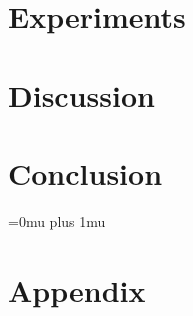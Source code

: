 \chapter{Experiments}\label{ch:lab}


\clearpage
\chapter{Discussion}


\clearpage
\chapter{Conclusion}


\clearpage
\Urlmuskip=0mu plus 1mu\relax
\sloppy

{}

\chapter{Appendix}\label{ch:appendix}




